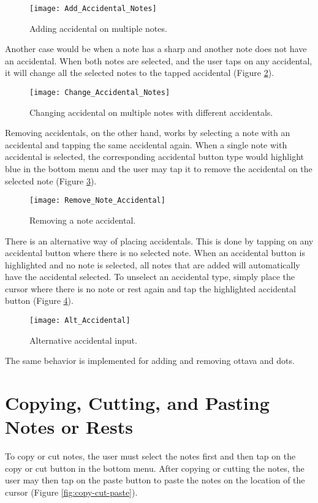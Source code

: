\begin{figure}[H]
  \centering
  \texttt{[image: Add\_Accidental\_Notes]}
    \caption{Adding accidental on multiple notes.}
    \label{fig:add-accidental-notes}
\end{figure}

Another case would be when a note has a sharp and another note does not have an accidental. When both notes are selected, and the user taps on any accidental, it will change all the selected notes to the tapped accidental (Figure \ref{fig:change-accidental-notes}).

\begin{figure}[H]
  \centering
  \texttt{[image: Change\_Accidental\_Notes]}
    \caption{Changing accidental on multiple notes with different accidentals.}
    \label{fig:change-accidental-notes}
\end{figure}

Removing accidentals, on the other hand, works by selecting a note with an accidental and tapping the same accidental again. When a single note with accidental is selected, the corresponding accidental button type would highlight blue in the bottom menu and the user may tap it to remove the accidental on the selected note (Figure \ref{fig:remove-note-accidental}).

\begin{figure}[H]
  \centering
  \texttt{[image: Remove\_Note\_Accidental]}
    \caption{Removing a note accidental.}
    \label{fig:remove-note-accidental}
\end{figure}

There is an alternative way of placing accidentals. This is done by tapping on any accidental button where there is no selected note. When an accidental button is highlighted and no note is selected, all notes that are added will automatically have the accidental selected. To unselect an accidental type, simply place the cursor where there is no note or rest again and tap the highlighted accidental button (Figure \ref{fig:alt-accidental}).

\begin{figure}[H]
  \centering
  \texttt{[image: Alt\_Accidental]}
    \caption{Alternative accidental input.}
    \label{fig:alt-accidental}
\end{figure}

The same behavior is implemented for adding and removing ottava and dots.

\section{Copying, Cutting, and Pasting Notes or Rests}
To copy or cut notes, the user must select the notes first and then tap on the copy or cut button in the bottom menu. After copying or cutting the notes, the user may then tap on the paste button to paste the notes on the location of the cursor (Figure \ref{fig:copy-cut-paste}).

